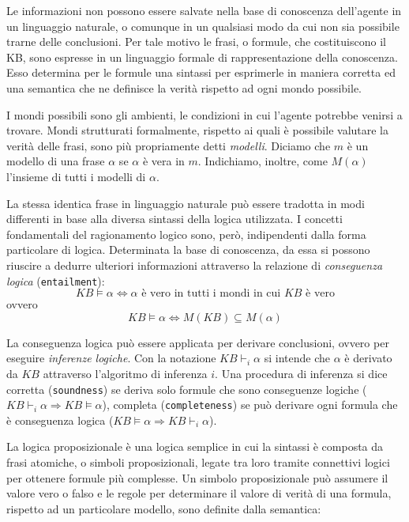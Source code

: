 		Le informazioni non possono essere salvate nella base di conoscenza dell'agente in un linguaggio naturale, o comunque in un qualsiasi modo da cui non sia possibile trarne delle conclusioni. Per tale motivo le frasi, o formule, che costituiscono il KB, sono espresse in un linguaggio formale di rappresentazione della conoscenza. Esso determina per le formule una sintassi per esprimerle in maniera corretta ed una semantica che ne definisce la verità rispetto ad ogni mondo possibile.\par
		I mondi possibili sono gli ambienti, le condizioni in cui l'agente potrebbe venirsi a trovare. Mondi strutturati formalmente, rispetto ai quali è possibile valutare la verità delle frasi, sono più propriamente detti \emph{modelli}. Diciamo che $m$ è un modello di una frase $\alpha$ se $\alpha$ è vera in $m$. Indichiamo, inoltre, come $M(\alpha)$ l'insieme di tutti i modelli di $\alpha$.\par
		La stessa identica frase in linguaggio naturale può essere tradotta in modi differenti in base alla diversa sintassi della logica utilizzata. I concetti fondamentali del ragionamento logico sono, però, indipendenti dalla forma particolare di logica. Determinata la base di conoscenza, da essa si possono riuscire a dedurre ulteriori informazioni attraverso la relazione di \emph{conseguenza logica} (\texttt{entailment}):
		\begin{equation}
		KB\vDash\alpha \iff \alpha \mbox{ è vero in tutti i mondi in cui } KB \mbox{ è vero}
		\end{equation}
		ovvero
		\begin{equation}
		KB\vDash\alpha \iff M(KB)\subseteq M(\alpha)
		\end{equation}\par
		La conseguenza logica può essere applicata per derivare conclusioni, ovvero per eseguire \emph{inferenze logiche}. Con la notazione $KB\vdash_{i}\alpha$ si intende che $\alpha$ è derivato da $KB$ attraverso l'algoritmo di inferenza $i$. Una procedura di inferenza si dice corretta (\texttt{soundness}) se deriva solo formule che sono conseguenze logiche ($KB\vdash_{i}\alpha\Longrightarrow KB\vDash\alpha$), completa (\texttt{completeness}) se può derivare ogni formula che è conseguenza logica ($KB\vDash\alpha\Longrightarrow KB\vdash_{i}\alpha$).\par
		La logica proposizionale è una logica semplice in cui la sintassi è composta da frasi atomiche, o simboli proposizionali, legate tra loro tramite connettivi logici per ottenere formule più complesse. Un simbolo proposizionale può assumere il valore vero o falso e le regole per determinare il valore di verità di una formula, rispetto ad un particolare modello, sono definite dalla semantica: 
